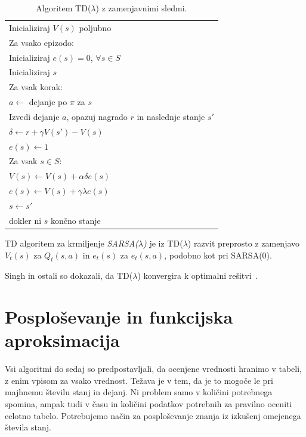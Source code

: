\documentclass[a4paper, oneside, 12pt]{report}
\begin{document}
\begin{table}[htbp]
\begin{center}
\begin{tabular}{| l |}
\hline
Inicializiraj $V(s)$ poljubno \\
Za vsako epizodo: \\
\quad Inicializiraj $e(s) = 0$, $\forall s \in S$ \\
\quad Inicializiraj $s$ \\
\quad Za vsak korak: \\
\quad \quad $a \gets$ dejanje po $\pi$ za $s$ \\
\quad \quad Izvedi dejanje $a$, opazuj nagrado $r$ in naslednje stanje $s'$ \\
\quad \quad $\delta \gets r + \gamma V(s') - V(s)$ \\
\quad \quad $e(s) \gets 1$ \\
\quad \quad Za vsak $s \in S$: \\
\quad \quad \quad $V(s) \gets V(s) + \alpha \delta e(s)$ \\
\quad \quad \quad $e(s) \gets V(s) + \gamma \lambda e(s)$ \\
\quad \quad $s \gets s'$ \\
\quad dokler ni $s$ končno stanje \\
\hline
\end{tabular}
\end{center}
\caption{Algoritem TD($\lambda$) z zamenjavnimi sledmi.}
\label{table:TDLambda}
\end{table}

TD algoritem za krmiljenje {\em SARSA($\lambda$)} je iz TD($\lambda$) razvit preprosto z zamenjavo $V_t(s)$ za $Q_t(s, a)$ in $e_t(s)$ za $e_t(s,a)$, podobno kot pri SARSA(0).

Singh in ostali so dokazali, da TD($\lambda$) konvergira k optimalni rešitvi~\cite{LearningWithoutStateEstimationInPartiallyObservableMarkovianDecisionProcesses}.

\chapter{Posploševanje in funkcijska aproksimacija}
\thispagestyle{fancy}
Vsi algoritmi do sedaj so predpostavljali, da ocenjene vrednosti hranimo v tabeli, z enim vpisom za vsako vrednost. Težava je v tem, da je to mogoče le pri majhnemu številu stanj in dejanj. Ni problem samo v količini potrebnega spomina, ampak tudi v času in količini podatkov potrebnih za pravilno oceniti celotno tabelo. Potrebujemo način za posploševanje znanja iz izkušenj omejenega števila stanj.
\end{document}
